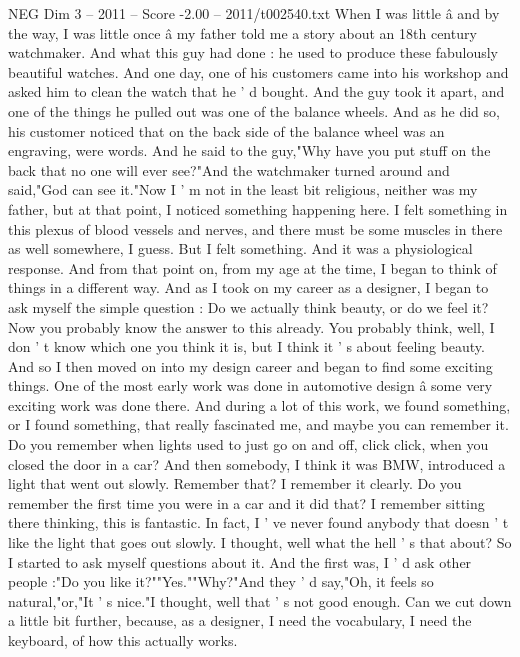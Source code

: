\begin{textsample}{NEG Dim 3 – 2011 – Score -2.00 – 2011/t002540.txt}  \label{ex:f3_neg_023}
When I was little â and by the way, I was little once â my father told me a story about an 18th century watchmaker.
And what this guy had done : he used to produce these fabulously beautiful watches.
And one day, one of his customers came into his workshop and asked him to clean the watch that he ' d bought.
And the guy took it apart, and one of the things he pulled out was one of the balance wheels.
And as he did so, his customer noticed that on the back side of the balance wheel was an engraving, were words.
And he said to the guy,"Why have you put stuff on the back that no one will ever see?"And the watchmaker turned around and said,"God can see it."Now I ' m not in the least bit religious, neither was my father, but at that point, I noticed something happening here.
I felt something in this plexus of blood vessels and nerves, and there must be some muscles in there as well somewhere, I guess.
But I felt something.
And it was a physiological response.
And from that point on, from my age at the time, I began to think of things in a different way.
And as I took on my career as a designer, I began to ask myself the simple question : Do we actually think beauty, or do we feel it?
Now you probably know the answer to this already.
You probably think, well, I don ' t know which one you think it is, but I think it ' s about feeling beauty.
And so I then moved on into my design career and began to find some exciting things.
One of the most early work was done in automotive design â some very exciting work was done there.
And during a lot of this work, we found something, or I found something, that really fascinated me, and maybe you can remember it.
Do you remember when lights used to just go on and off, click click, when you closed the door in a car?
And then somebody, I think it was BMW, introduced a light that went out slowly.
Remember that?
I remember it clearly.
Do you remember the first time you were in a car and it did that?
I remember sitting there thinking, this is fantastic.
In fact, I ' ve never found anybody that doesn ' t like the light that goes out slowly.
I thought, well what the hell ' s that about?
So I started to ask myself questions about it.
And the first was, I ' d ask other people :"Do you like it?""Yes.""Why?"And they ' d say,"Oh, it feels so natural,"or,"It ' s nice."I thought, well that ' s not good enough.
Can we cut down a little bit further, because, as a designer, I need the vocabulary, I need the keyboard, of how this actually works.

\end{textsample}

